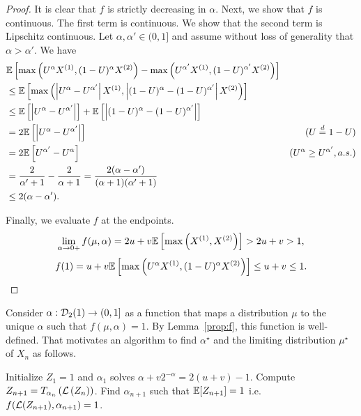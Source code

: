 \begin{proof}
  It is clear that $f$ is strictly decreasing in $\alpha$. Next, we show that $f$ is continuous. The first term is continuous. We show that the second term is Lipschitz continuous. Let $\alpha, \alpha' \in (0,1]$ and assume without loss of generality that $\alpha > \alpha'$. We have
  \begin{align*}
     & \mathbb{E}\left[\max\left(U^\alpha X^{(1)}, (1-U)^\alpha X^{(2)}\right) - \max\left(U^{\alpha'} X^{(1)}, (1-U)^{\alpha'} X^{(2)}\right)\right] \\
     & \le \mathbb{E}\left[\max\left(\left|U^\alpha - U^{\alpha'}\right|X^{(1)}, \left|(1-U)^\alpha - (1-U)^{\alpha'}\right|X^{(2)}\right)\right]     \\
     & \le \mathbb{E}\left[\left|U^\alpha - U^{\alpha'}\right|\right] + \mathbb{E}\left[\left|(1-U)^\alpha - (1-U)^{\alpha'}\right|\right]                   \\
     & = 2\mathbb{E}\left[\left|U^\alpha - U^{\alpha'}\right|\right]
     & \text{($U \stackrel{d}{=} 1-U$)}                                                                                                        \\
     & = 2\mathbb{E}\left[U^{\alpha'} - U^{\alpha}\right]
     & \text{($U^\alpha\ge U^{\alpha'}, a.s.$)}                                                                                                \\
     & = \dfrac{2}{\alpha'+1} - \dfrac{2}{\alpha+1} = \dfrac{2(\alpha-\alpha')}{(\alpha+1)(\alpha'+1)}                                         \\
     & \le 2(\alpha-\alpha').
  \end{align*}

  Finally, we evaluate $f$ at the endpoints.
  $$\lim_{\alpha \to 0+} f(\mu, \alpha) = 2u+v\mathbb{E}\left[\max\left(X^{(1)}, X^{(2)}\right)\right] > 2u+v > 1,$$
  $$f(1) = u + v\mathbb{E}\left[\max\left(U^\alpha X^{(1)}, (1-U)^\alpha X^{(2)}\right)\right] \le u+v \le 1.$$
\end{proof}

Consider $\alpha: \mathcal{D}_2(1) \to (0,1]$ as a function that maps a distribution $\mu$ to the unique $\alpha$ such that $f(\mu, \alpha) = 1$. By Lemma~\ref{prop:f}, this function is well-defined. That motivates an algorithm to find $\alpha^\star$ and the limiting distribution $\mu^\star$ of $X_n$ as follows.

\begin{algorithm}[H]
  \caption{}
  \label{alg:alpha}
  \begin{algorithmic}[1]
    \State Initialize $Z_1 = 1$ and $\alpha_1$ solves $\alpha + v2^{-\alpha} = 2(u+v)-1$.
    \State Compute $Z_{n+1} = T_{\alpha_n}\left(\mathcal{L}\left(Z_n\right)\right)$.
    \State Find $\alpha_{n+1}$ such that $\mathbb{E}[Z_{n+1}] = 1$ i.e. $f(\mathcal{L}(Z_{n+1}), \alpha_{n+1}) = 1$.
    \EndFor
  \end{algorithmic}
\end{algorithm}

